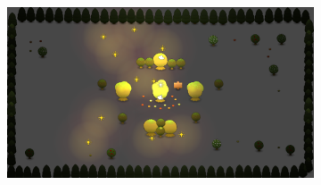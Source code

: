 \begin{figure}[h]
\begin{subfigure}[b]{0.48\linewidth}
                \caption{}
                \label{fig:ga_outcome_5}
        \end{subfigure}
        \begin{subfigure}[b]{0.48\linewidth}
                \includegraphics[width=\linewidth]{./ga_outcome_6}
                \caption{}
                \label{fig:ga_outcome_6}
        \end{subfigure}
        \caption{}
        \label{fig:GA_Final}
\end{figure}